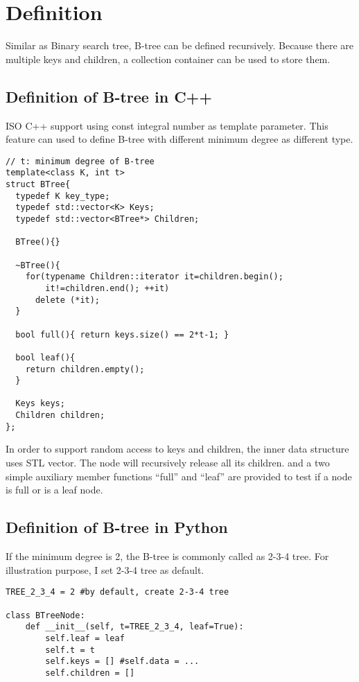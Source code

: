 \documentclass{article}
\begin{document}
\section{Definition}
\label{btree-definition}

Similar as Binary search tree, B-tree can be defined recursively.
Because there are multiple keys and children, a collection container
can be used to store them.

\subsection*{Definition of B-tree in C++}
ISO C++ support using const integral number as template parameter.
This feature can used to define B-tree with different minimum degree
as different type.

\lstset{language=C++}
\begin{lstlisting}
// t: minimum degree of B-tree
template<class K, int t>
struct BTree{
  typedef K key_type;
  typedef std::vector<K> Keys;
  typedef std::vector<BTree*> Children;

  BTree(){}

  ~BTree(){
    for(typename Children::iterator it=children.begin();
        it!=children.end(); ++it)
      delete (*it);
  }

  bool full(){ return keys.size() == 2*t-1; }

  bool leaf(){
    return children.empty();
  }

  Keys keys;
  Children children;
};
\end{lstlisting}

In order to support random access to keys and children, the
inner data structure uses STL vector. The node will recursively
release all its children. and a two simple auxiliary member
functions ``full'' and ``leaf'' are provided to test if a node
is full or is a leaf node.

\subsection*{Definition of B-tree in Python}

If the minimum degree is 2, the B-tree is commonly called as 2-3-4 tree.
For illustration purpose, I set 2-3-4 tree as default.

\lstset{language=Python}
\begin{lstlisting}
TREE_2_3_4 = 2 #by default, create 2-3-4 tree

class BTreeNode:
    def __init__(self, t=TREE_2_3_4, leaf=True):
        self.leaf = leaf
        self.t = t
        self.keys = [] #self.data = ...
        self.children = []
\end{lstlisting}
\end{document}
